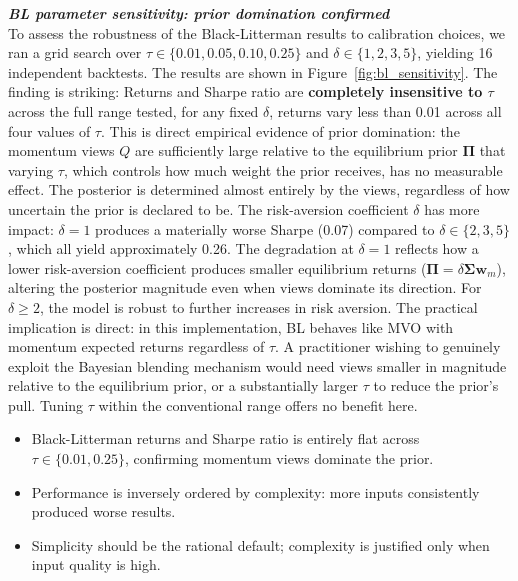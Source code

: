 \documentclass[a4paper,alpha-refs]{scr-contemporary}
\numberwithin{equation}{section}
\begin{document}
\noindent\textbf{\emph{BL parameter sensitivity: prior domination confirmed}} \\
\indent To assess the robustness of the Black-Litterman results to calibration choices,
we ran a grid search over $\tau \in \{0.01, 0.05, 0.10, 0.25\}$ and $\delta \in
\{1, 2, 3, 5\}$, yielding 16 independent backtests. The results are shown in
Figure~\ref{fig:bl_sensitivity}. The finding is striking: Returns and Sharpe ratio are
\textbf{completely insensitive to $\tau$} across the full range tested, for any
fixed $\delta$, returns vary less than 0.01 across all four values of $\tau$.
This is direct empirical evidence of prior domination: the momentum views $Q$ are
sufficiently large relative to the equilibrium prior $\boldsymbol{\Pi}$ that varying
$\tau$, which controls how much weight the prior receives, has no measurable
effect. \newline 
\indent The posterior is determined almost entirely by the views, regardless of how
uncertain the prior is declared to be. \newline
\indent The risk-aversion coefficient $\delta$ has more impact: $\delta = 1$ produces a
materially worse Sharpe (0.07) compared to $\delta \in \{2, 3, 5\}$, which all yield
approximately 0.26. The degradation at $\delta = 1$ reflects how a lower risk-aversion
coefficient produces smaller equilibrium returns ($\boldsymbol{\Pi} = \delta
\boldsymbol{\Sigma}\mathbf{w}_m$), altering the posterior magnitude even when views
dominate its direction. For $\delta \geq 2$, the model is robust to further increases
in risk aversion. \newline
\indent The practical implication is direct: in this implementation, BL behaves like MVO
with momentum expected returns regardless of $\tau$. A practitioner wishing to
genuinely exploit the Bayesian blending mechanism would need views smaller in magnitude
relative to the equilibrium prior, or a substantially larger $\tau$ to reduce the
prior's pull. Tuning $\tau$ within the conventional range offers no benefit here. \\

\begin{keypoints*}
\begin{itemize}
  \item Black-Litterman returns and Sharpe ratio is entirely flat across $\tau \in \{0.01, 0.25\}$, confirming momentum views dominate the prior.
  \item Performance is inversely ordered by complexity: more inputs consistently produced worse results.
  \item Simplicity should be the rational default; complexity is justified only when input quality is high.
\end{itemize}
\end{keypoints*}
\end{document}
